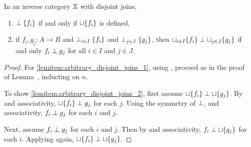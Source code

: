 \begin{lemma}\label{lem:arbitrary_disjoint_joins}
  In an inverse category $\mathbb{X}$ with disjoint joins,
  \begin{enumerate}[{(}i{)}]
    \item $\perp \{f_i\}$ if and only if  $\sqcup \{f_i\}$ is
      defined,\label{lemitem:arbitrary_disjoint_joins_1}
    \item if $f_i, g_j : A \to B$ and $\perp_{i\in I} \{f_i\}$ and $\perp_{j\in J} \{g_j\}$,
      then $\sqcup_{i\in I} \{f_i\} \perp \sqcup_{j\in J} \{g_j\}$ if and only $f_i \perp g_j$
      for all $i\in I$ and $j\in J$. \label{lemitem:arbitrary_disjoint_joins_2}
  \end{enumerate}
\end{lemma}
\begin{proof}
  For \ref{lemitem:arbitrary_disjoint_joins_1}, using , proceed as in the proof of
  Lemma~,
  inducting on $n$.

  To show \ref{lemitem:arbitrary_disjoint_joins_2}, first assume $\sqcup \{f_i\} \perp \sqcup
  \{g_j\}$. By  and associativity, $\sqcup \{f_i\} \perp g_j$ for each
  $j$. Using the symmetry of $\perp$,  and associativity, $f_i \perp
  g_j$ for each $i$ and $j$.

  Next, assume $f_i \perp g_j$ for each $i$ and $j$. Then by  and associativity, $f_i
  \perp \sqcup \{g_j\}$ for each $i$. Applying  again, $\sqcup \{f_i\} \perp
  \sqcup \{g_j\}$.
\end{proof}


